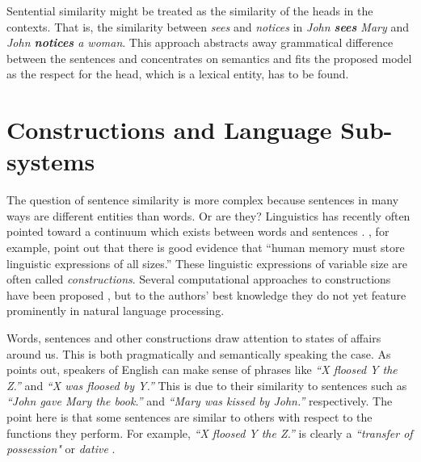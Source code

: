 \documentclass[11pt]{article}
\begin{document}
Sentential similarity might be treated as the similarity of the heads in the contexts. That is, the similarity between \textit{sees} and \textit{notices} in \textit{John \textbf{sees} Mary} and \textit{John \textbf{notices} a woman}. This approach abstracts away grammatical difference between the sentences and concentrates on semantics and fits the proposed model as the respect for the head, which is a lexical entity, has to be found.

\section{Constructions and Language Sub-systems}

The question of sentence similarity is more complex because sentences in many ways are different entities than words. Or are they? Linguistics has recently often pointed toward a continuum which exists between words and sentences \cite{jackendoff2012cambridge}. , for example, point out that there is good evidence that ``human memory must store linguistic expressions of all sizes.'' These linguistic expressions of variable size are often called \emph{constructions}. Several computational approaches to constructions have been proposed \cite{Gaspers2011,chang2012computational}, but to the authors' best knowledge they do not yet feature prominently in natural language processing.

Words, sentences and other constructions draw attention to states of affairs around us. This is both pragmatically and semantically speaking the case. As  points out, speakers of English can make sense of phrases like \textit{``X floosed Y the Z.''} and \textit{``X was floosed by Y.''} This is due to their similarity to sentences such as \textit{``John gave Mary the book.''} and \textit{``Mary was kissed by John.''} respectively.  The point here is that some sentences are similar to others with respect to the functions they perform. For example, \textit{``X floosed Y the Z.''} is clearly a \emph{``transfer of possession"} or \emph{dative} \cite{bresnan2007predicting}.

\end{document}

